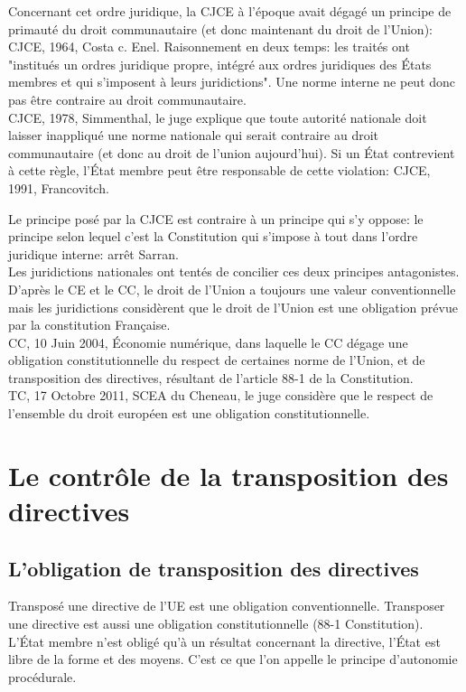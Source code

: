 \documentclass[10pt, a4paper, openany]{book}
\begin{document}
Concernant cet ordre juridique, la CJCE à l'époque avait dégagé un principe de primauté du droit communautaire (et donc maintenant du droit de l'Union): CJCE, 1964, Costa c. Enel. Raisonnement en deux temps: les traités ont "institués un ordres juridique propre, intégré aux ordres juridiques des États membres et qui s'imposent à leurs juridictions". Une norme interne ne peut donc pas être contraire au droit communautaire. \\
CJCE, 1978, Simmenthal, le juge explique que toute autorité nationale doit laisser inappliqué une norme nationale qui serait contraire au droit communautaire (et donc au droit de l'union aujourd'hui). Si un État contrevient à cette règle, l'État membre peut être responsable de cette violation: CJCE, 1991, Francovitch. 


Le principe posé par la CJCE est contraire à un principe qui s'y oppose: le principe selon lequel c'est la Constitution qui s'impose à tout dans l'ordre juridique interne: arrêt Sarran. \\
Les juridictions nationales ont tentés de concilier ces deux principes antagonistes. D'après le CE et le CC, le droit de l'Union a toujours une valeur conventionnelle mais les juridictions considèrent que le droit de l'Union est une obligation prévue par la constitution Française. \\
CC, 10 Juin 2004, Économie numérique, dans laquelle le CC dégage une obligation constitutionnelle du respect de certaines norme de l'Union, et de transposition des directives, résultant de l'article 88-1 de la Constitution. \\
TC, 17 Octobre 2011, SCEA du Cheneau, le juge considère que le respect de l'ensemble du droit européen est une obligation constitutionnelle. 


\section{Le contrôle de la transposition des directives}

\subsection{L'obligation de transposition des directives}

Transposé une directive de l'UE est une obligation conventionnelle. Transposer une directive est aussi une obligation constitutionnelle (88-1 Constitution). L'État membre n'est obligé qu'à un résultat concernant la directive, l'État est libre de la forme et des moyens. C'est ce que l'on appelle le principe d'autonomie procédurale. 
\end{document}
